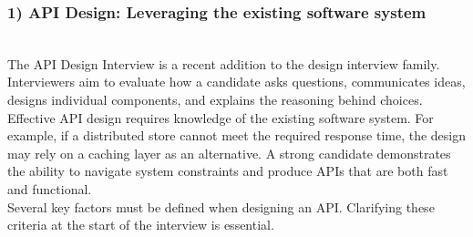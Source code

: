 \subsubsection{1) API Design: Leveraging the existing software system}\label{ApOFq7_RXcaFynh1Kan_M}
\\
The API Design Interview is a recent addition to the design interview family. Interviewers aim to evaluate how a candidate asks questions, communicates ideas, designs individual components, and explains the reasoning behind choices.
\\
Effective API design requires knowledge of the existing software system. For example, if a distributed store cannot meet the required response time, the design may rely on a caching layer as an alternative. A strong candidate demonstrates the ability to navigate system constraints and produce APIs that are both fast and functional.
\\
Several key factors must be defined when designing an API. Clarifying these criteria at the start of the interview is essential.

